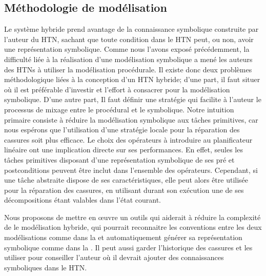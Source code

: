 \documentclass[a4paper,twoside,french]{article}
\begin{document}
		\subsection{Méthodologie de modélisation}
		Le système hybride prend avantage de la connaissance symbolique construite par l'auteur du HTN, sachant que toute condition  dans le HTN peut, ou non, avoir une représentation symbolique. Comme  nous l'avons exposé précédemment, la difficulté liée à la réalisation d'une modélisation symbolique a mené les auteurs des HTNs à utiliser la modélisation procédurale. Il existe donc deux problèmes méthodologique liées à la conception d'un HTN hybride;  d'une part, il faut situer où il est préférable d'investir et l'effort à consacrer pour la modélisation symbolique. D'une autre part, Il faut définir une stratégie qui facilite à l'auteur le processus de mixage entre le procédural et le symbolique. Notre intuition primaire consiste à réduire la modélisation symbolique aux tâches primitives, car nous espérons que l'utilisation d'une stratégie locale pour la réparation des cassures soit plus efficace. Le choix des opérateurs à introduire au planificateur linéaire ont une implication directe sur ses performances. En effet, seules les tâches primitives disposant d'une représentation symbolique de ses pré et postconditions peuvent être inclut dans l'ensemble des opérateurs. Cependant, si une tâche abstraite dispose de ses caractéristiques, elle peut alors être  utilisée pour la réparation des cassures, en utilisant durant son exécution une de ses décompositions étant valables dans l'état courant. 
		\par Nous proposons de mettre en œuvre un outils qui aiderait à réduire la complexité de le modélisation hybride, qui pourrait reconnaitre les conventions entre les deux modélisations comme dans la  et automatiquement générer sa représentation symbolique comme dans la   . Il peut aussi garder l'historique des cassures et les utiliser pour conseiller l'auteur où il devrait ajouter des connaissances symboliques dans le HTN.
\end{document}
